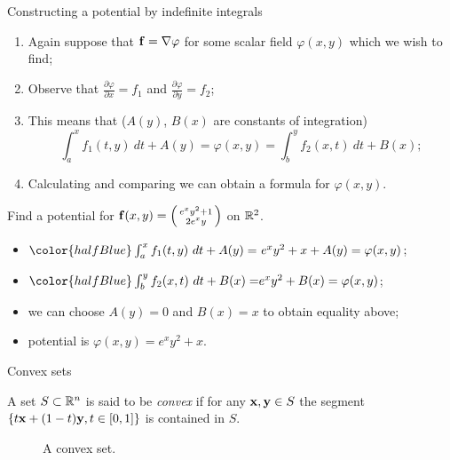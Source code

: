 {Constructing a potential by indefinite integrals}

\begin{enumerate}
    \item Again suppose that \(\mathbf{f} = \nabla \varphi\) for some scalar field \(\varphi(x,y)\) which we wish to find;
    \item Observe that \(\frac{\partial \varphi}{\partial x} = f_1\) and  \(\frac{\partial \varphi}{\partial y} = f_2\);
    \item  This means that (\(A(y)\), \(B(x)\) are constants of integration)
          \[
              \int_{a}^{x} f_1(t,y) \ dt + A(y) = \varphi(x,y) =  \int_{b}^{y} f_2(x,t) \ dt + B(x);
          \]
    \item Calculating and comparing we can obtain a formula for \(\varphi(x,y)\).
\end{enumerate}


\begin{example}
    Find a potential for \(\mathbf{f}(x,y) = \left(\begin{smallmatrix}
        e^x y^2 + 1\\ 2e^x y
    \end{smallmatrix}\right)\) on \(\mathbb{R}^2\).
    \begin{itemize}
        \item \({\color{halfBlue} \int_{a}^{x} f_1(t,y) \ dt + A(y) = } \ e^x y^2 + x + A(y) = \varphi(x,y)\);
        \item \( {\color{halfBlue} \int_{b}^{y} f_2(x,t) \ dt + B(x) = }  e^x y^2 + B(x) = \varphi(x,y) \);
        \item we can choose \(A(y) = 0\) and \(B(x)=x\) to obtain equality above;
        \item potential is \(\varphi(x,y) = e^x y^2 + x\).
    \end{itemize}
\end{example}




{Convex sets}


\begin{definition}
    A set \(S\subset \mathbb{R}^n\) is said to be \emph{convex} if for any \(\mathbf{x},\mathbf{y}\in S\) the segment \(\{t\mathbf{x} + (1-t)\mathbf{y}, t\in[0,1]\}\) is contained in \(S\).
\end{definition}



\begin{figure}
    \caption{A convex set.}
\end{figure}


